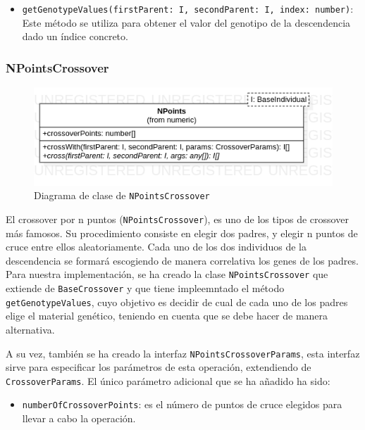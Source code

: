 \begin{itemize}
    \item \texttt{getGenotypeValues(firstParent: I, secondParent: I, index: number)}: Este método se utiliza para obtener el valor del genotipo de la descendencia dado un índice concreto.
\end{itemize}

\subsubsection{NPointsCrossover}

\begin{figure}[ht]
    \centering
    \includegraphics[scale=0.5]{mem/images/cap-4/4.2.6(Crossover)/NPoints.png}
    \caption{Diagrama de clase de \texttt{NPointsCrossover}}
    \label{fig:my_label}
\end{figure}

El crossover por n puntos (\texttt{NPointsCrossover}), es uno de los tipos de crossover más famosos. Su procedimiento consiste en elegir dos padres, y elegir n puntos de cruce entre ellos aleatoriamente. Cada uno de los dos individuos de la descendencia se formará escogiendo de manera correlativa los genes de los padres. \\

Para nuestra implementación, se ha creado la clase \texttt{NPointsCrossover} que extiende de \texttt{BaseCrossover} y que tiene impleemntado el método \texttt{getGenotypeValues}, cuyo objetivo es decidir de cual de cada uno de los padres elige el material genético, teniendo en cuenta que se debe hacer de manera alternativa.

A su vez, también se ha creado la interfaz \texttt{NPointsCrossoverParams}, esta interfaz sirve para especificar los parámetros de esta operación, extendiendo de \texttt{CrossoverParams}. El único parámetro adicional que se ha añadido ha sido:

\begin{itemize}
    \item \texttt{numberOfCrossoverPoints}: es el número de puntos de cruce elegidos para llevar a cabo la operación.
\end{itemize}

